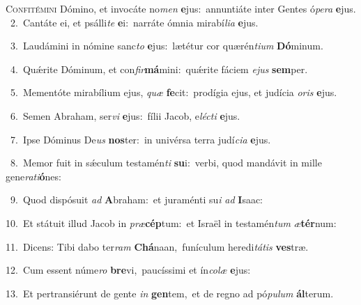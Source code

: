\lettrine{\initial\textcolor{\initialcolor}{C}}{onfitémini} Dómino, et invocáte no\textit{men} \textbf{e}\-jus:~\star annuntiáte inter Gentes ó\-\textit{pe}\-\textit{ra} \textbf{e}\-jus.\\
{\numbfont\textcolor{\numbcolor}{~2.}}~Cantáte ei, et psálli\textit{te} \textbf{e}\-i:~\star narráte ómnia mirabí\-\textit{li}\-\textit{a} \textbf{e}\-jus.\par
{\numbfont\textcolor{\numbcolor}{~3.}}~Laudámini in nómine sanc\textit{to} \textbf{e}\-jus:~\star lætétur cor quærén\-\textit{ti}\-\textit{um} \textbf{Dó}\-minum.\par
{\numbfont\textcolor{\numbcolor}{~4.}}~Quǽrite Dóminum, et con\-\textit{fir}\-\textbf{má}mini:~\star quǽrite fáciem \textit{e}\-\textit{jus} \textbf{sem}\-per.\par
{\numbfont\textcolor{\numbcolor}{~5.}}~Mementóte mirabílium ejus, \textit{quæ} \textbf{fe}\-cit:~\star prodígia ejus, et judícia \textit{o}\-\textit{ris} \textbf{e}\-jus.\par
{\numbfont\textcolor{\numbcolor}{~6.}}~Semen Abraham, ser\textit{vi} \textbf{e}\-jus:~\star fílii Jacob, e\-\textit{léc}\-\textit{ti} \textbf{e}\-jus.\par
{\numbfont\textcolor{\numbcolor}{~7.}}~Ipse Dóminus De\textit{us} \textbf{nos}\-ter:~\star in univérsa terra judí\-\textit{ci}\-\textit{a} \textbf{e}\-jus.\par
{\numbfont\textcolor{\numbcolor}{~8.}}~Memor fuit in sǽculum testamén\textit{ti} \textbf{su}\-i:~\star verbi, quod mandávit in mille gene\-\textit{ra}\-\textit{ti}\textbf{ó}nes:\par
{\numbfont\textcolor{\numbcolor}{~9.}}~Quod dispósuit \textit{ad} \textbf{A}\-braham:~\star et juraménti su\textit{i} \textit{ad} \textbf{I}\-saac:\par
{\numbfont\textcolor{\numbcolor}{10.}}~Et státuit illud Jacob in \textit{præ}\-\textbf{cép}tum:~\star et Israël in testamén\textit{tum} \textit{æ}\-\textbf{tér}num:\par
{\numbfont\textcolor{\numbcolor}{11.}}~Dicens: Tibi dabo ter\textit{ram} \textbf{Chá}\-naan,~\star funículum heredi\-\textit{tá}\-\textit{tis} \textbf{ves}\-træ.\par
{\numbfont\textcolor{\numbcolor}{12.}}~Cum essent núme\textit{ro} \textbf{bre}\-vi,~\star paucíssimi et ín\-\textit{co}\-\textit{læ} \textbf{e}\-jus:\par
{\numbfont\textcolor{\numbcolor}{13.}}~Et pertransiérunt de gente \textit{in} \textbf{gen}\-tem,~\star et de regno ad pó\-\textit{pu}\-\textit{lum} \textbf{ál}\-terum.\par
